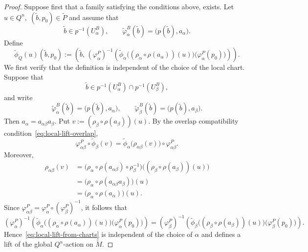 \documentclass[10pt,a4paper]{amsart}
\begin{document}
\begin{proof}
Suppose first that a family satisfying the conditions above, exists. Let $u\in Q^n,\;
(\widetilde b,p_0)\in\widetilde P$
and assume that
\[
\widetilde b\in p^{-1}(U_\alpha^B),
\qquad
\widetilde\varphi_\alpha^B(\widetilde b)
=
\bigl(p(\widetilde b),a_\alpha\bigr).
\]
Define
\begin{equation}
\label{eq:local-lift-from-charts}
\widetilde\phi_Q(u)(\widetilde b,p_0)
:=
\left(
\widetilde b,\,
(\varphi_\alpha^P)^{-1}
\left(
\widetilde\phi_\alpha
\bigl(
(\rho_\alpha\circ\rho(a_\alpha))(u)
\bigr)
\bigl(\varphi_\alpha^P(p_0)\bigr)
\right)
\right).
\end{equation}
We first verify that the definition is independent of the choice of the local chart. Suppose that
\[
\widetilde b \in p^{-1}(U_\alpha^B)\cap p^{-1}(U_\beta^B),
\]
and write
\[
\widetilde\varphi_\alpha^B(\widetilde b) = \bigl(p(\widetilde b),a_\alpha\bigr), \qquad \widetilde\varphi_\beta^B(\widetilde b) = \bigl(p(\widetilde b),a_\beta\bigr).
\]
Then $a_\alpha=a_{\alpha\beta}a_\beta$.
Put $v := (\rho_\beta\circ\rho(a_\beta))(u)$.
By the overlap compatibility condition~\eqref{eq:local-lift-overlap},
\[
\varphi_{\alpha\beta}^P\circ \widetilde\phi_\beta(v) = \widetilde\phi_\alpha\bigl(\rho_{\alpha\beta}(v)\bigr) \circ \varphi_{\alpha\beta}^P.
\]
Moreover,
\begin{align*}
\rho_{\alpha\beta}(v)
&=
\bigl(
\rho_\alpha\circ
\rho(a_{\alpha\beta})\circ
\rho_\beta^{-1}
\bigr)
\bigl(
(\rho_\beta\circ\rho(a_\beta))(u)
\bigr)
\\
&=
\bigl(
\rho_\alpha\circ
\rho(a_{\alpha\beta}a_\beta)
\bigr)(u)
\\
&=
\bigl(
\rho_\alpha\circ\rho(a_\alpha)
\bigr)(u).
\end{align*}
Since $\varphi_{\alpha\beta}^P
=
\varphi_\alpha^P\circ(\varphi_\beta^P)^{-1}$, it follows that
\[(\varphi_\alpha^P)^{-1}
\left(
\widetilde\phi_\alpha
\bigl(
(\rho_\alpha\circ\rho(a_\alpha))(u)
\bigr)
\bigl(\varphi_\alpha^P(p_0)\bigr)
\right)=
(\varphi_\beta^P)^{-1}
\left(
\widetilde\phi_\beta
\bigl(
(\rho_\beta\circ\rho(a_\beta))(u)
\bigr)
\bigl(\varphi_\beta^P(p_0)\bigr)
\right).\]
Hence~\eqref{eq:local-lift-from-charts} is independent of the choice of \(\alpha\) and defines a lift of the global \(Q^n\)-action on \(\widetilde M\).


\end{proof}
\end{document}
